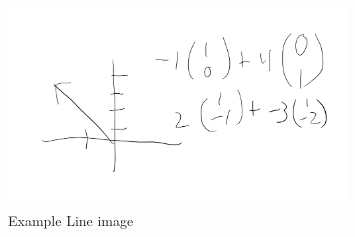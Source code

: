 \begin{figure}[h]
  \centering
  \includegraphics[width=0.8\textwidth]{resource/images/8-2Figure1.png}
  \caption{Example Line image}
  \label{fig:}
\end{figure}

